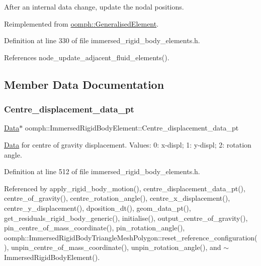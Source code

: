 After an internal data change, update the nodal positions. 



Reimplemented from \hyperlink{classoomph_1_1GeneralisedElement_a0c94ccb2cad3bcf15f97a6e5a6dff90b}{oomph\+::\+Generalised\+Element}.



Definition at line 330 of file immersed\+\_\+rigid\+\_\+body\+\_\+elements.\+h.



References node\+\_\+update\+\_\+adjacent\+\_\+fluid\+\_\+elements().



\subsection{Member Data Documentation}
\mbox{\label{classoomph_1_1ImmersedRigidBodyElement_a87594c1ac3388016571800ef590e0873}} 
\subsubsection{\texorpdfstring{Centre\+\_\+displacement\+\_\+data\+\_\+pt}{Centre\_displacement\_data\_pt}}
{\footnotesize\ttfamily \hyperlink{classoomph_1_1Data}{Data}$\ast$ oomph\+::\+Immersed\+Rigid\+Body\+Element\+::\+Centre\+\_\+displacement\+\_\+data\+\_\+pt\hspace{0.3cm}{\ttfamily [protected]}}



\hyperlink{classoomph_1_1Data}{Data} for centre of gravity displacement. Values\+: 0\+: x-\/displ; 1\+: y-\/displ; 2\+: rotation angle. 



Definition at line 512 of file immersed\+\_\+rigid\+\_\+body\+\_\+elements.\+h.



Referenced by apply\+\_\+rigid\+\_\+body\+\_\+motion(), centre\+\_\+displacement\+\_\+data\+\_\+pt(), centre\+\_\+of\+\_\+gravity(), centre\+\_\+rotation\+\_\+angle(), centre\+\_\+x\+\_\+displacement(), centre\+\_\+y\+\_\+displacement(), dposition\+\_\+dt(), geom\+\_\+data\+\_\+pt(), get\+\_\+residuals\+\_\+rigid\+\_\+body\+\_\+generic(), initialise(), output\+\_\+centre\+\_\+of\+\_\+gravity(), pin\+\_\+centre\+\_\+of\+\_\+mass\+\_\+coordinate(), pin\+\_\+rotation\+\_\+angle(), oomph\+::\+Immersed\+Rigid\+Body\+Triangle\+Mesh\+Polygon\+::reset\+\_\+reference\+\_\+configuration(), unpin\+\_\+centre\+\_\+of\+\_\+mass\+\_\+coordinate(), unpin\+\_\+rotation\+\_\+angle(), and $\sim$\+Immersed\+Rigid\+Body\+Element().

